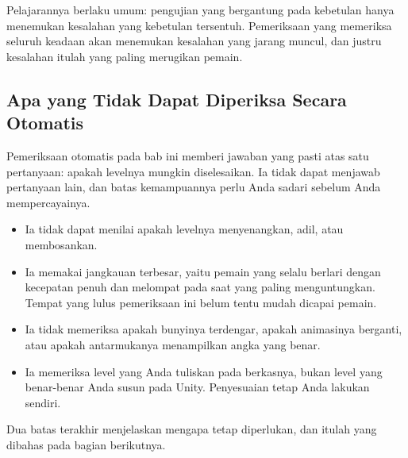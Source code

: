 \begin{catatabox}
Pelajarannya berlaku umum: pengujian yang bergantung pada kebetulan hanya
menemukan kesalahan yang kebetulan tersentuh. Pemeriksaan yang memeriksa
seluruh keadaan akan menemukan kesalahan yang jarang muncul, dan justru
kesalahan itulah yang paling merugikan pemain.
\end{catatabox}

\subsection{Apa yang Tidak Dapat Diperiksa Secara Otomatis}

Pemeriksaan otomatis pada bab ini memberi jawaban yang pasti atas satu
pertanyaan: apakah levelnya mungkin diselesaikan. Ia tidak dapat menjawab
pertanyaan lain, dan batas kemampuannya perlu Anda sadari sebelum Anda
mempercayainya.

\begin{itemize}
  \item Ia tidak dapat menilai apakah levelnya menyenangkan, adil, atau
        membosankan.
  \item Ia memakai jangkauan terbesar, yaitu pemain yang selalu berlari dengan
        kecepatan penuh dan melompat pada saat yang paling menguntungkan.
        Tempat yang lulus pemeriksaan ini belum tentu mudah dicapai pemain.
  \item Ia tidak memeriksa apakah bunyinya terdengar, apakah animasinya
        berganti, atau apakah antarmukanya menampilkan angka yang benar.
  \item Ia memeriksa level yang Anda tuliskan pada berkasnya, bukan level yang
        benar-benar Anda susun pada Unity. Penyesuaian tetap Anda lakukan
        sendiri.
\end{itemize}

Dua batas terakhir menjelaskan mengapa  tetap diperlukan,
dan itulah yang dibahas pada bagian berikutnya.

